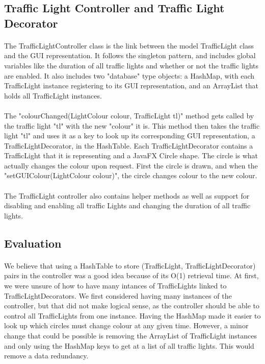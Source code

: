 \documentclass[a4paper,11pt,titlepage]{article}
\begin{document}
\subsection{Traffic Light Controller and Traffic Light Decorator}
\paragraph{}
The TrafficLightController class is the link between the model TrafficLight class and the GUI representation. It follows the singleton pattern, and includes global variables like the duration of all traffic lights and whether or not the traffic lights are enabled. It also includes two "database" type objects: a HashMap, with each TrafficLight instance registering to its GUI representation, and an ArrayList that holds all TrafficLight instances.
\paragraph{}
The "colourChanged(LightColour colour, TrafficLight tl)" method gets called by the traffic light "tl" with the new "colour" it is. This method then takes the traffic light "tl" and uses it as a key to look up its corresponding GUI representation, a TrafficLightDecorator, in the HashTable. Each TrafficLightDecorator contains a TrafficLight that it is representing and a JavaFX Circle shape. The circle is what actually changes the colour upon request. First the circle is drawn, and when the "setGUIColour(LightColour colour)", the circle changes colour to the new colour.
\paragraph{}
The TrafficLight controller also contains helper methods as well as support for disabling and enabling all traffic Lights and changing the duration of all traffic lights.

\subsection{Evaluation}
\paragraph{}
We believe that using a HashTable to store (TrafficLight, TrafficLightDecorator) pairs in the controller was a good idea because of its O(1) retrieval time. At first, we were unsure of how to have many intances of TrafficLights linked to TrafficLightDecorators. We first considered having many instances of the controller, but that did not make logical sense, as the controller should be able to control all TrafficLights from one instance. Having the HashMap made it easier to look up which circles must change colour at any given time. However, a minor change that could be possible is removing the ArrayList of TrafficLight instances and only using the HashMap keys to get at a list of all traffic lights. This would remove a data redundancy.
\end{document}
